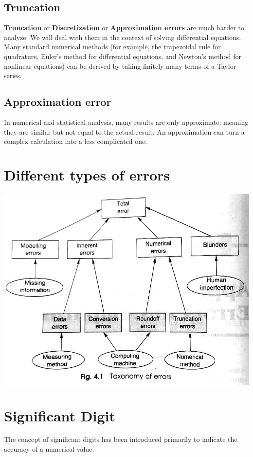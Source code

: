 \documentclass[11pt, a4paper, oneside]{book}
\begin{document}
          \subsection{Truncation}
            \textbf{Truncation} or \textbf{Discretization} or \textbf{Approximation errors} are much
            harder to analyze. We will deal with them in the context of solving differential equations.
            Many standard numerical methods (for example, the trapezoidal rule for quadrature,
            Euler's method for differential equations, and Newton's method for nonlinear equations) can
            be derived by taking finitely many terms of a Taylor series.

          \subsection{Approximation error}
            In numerical and statistical analysis, many results are only approximate; meaning they are
            similar but not equal to the actual result. An approximation can turn a complex calculation
            into a less complicated one.


        \section{Different types of errors}
          \includegraphics[scale=1.7]{toe.jpeg}

        \section{Significant Digit}
          The concept of significant digits has been introduced primarily to indicate the accuracy of a
          numerical value.
\end{document}
